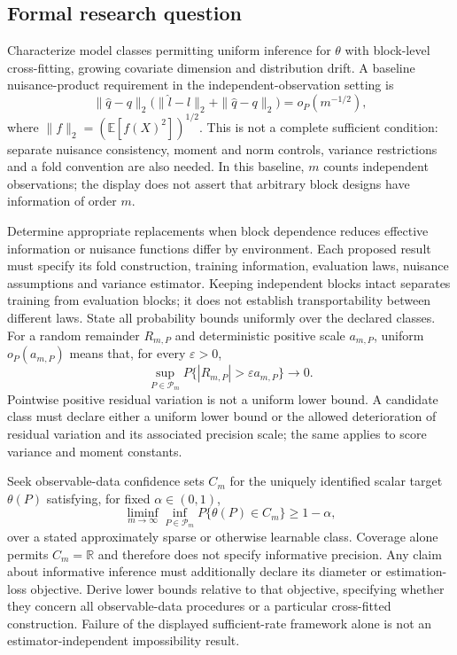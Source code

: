 \documentclass[11pt,a4paper]{article}
\begin{document}
\subsection*{Formal research question}

Characterize model classes permitting uniform inference for $\theta$ with block-level cross-fitting, growing covariate dimension and distribution drift. A baseline nuisance-product requirement in the independent-observation setting is
\[
\|\widehat q-q\|_2
\bigl(\|\widehat l-l\|_2+\|\widehat q-q\|_2\bigr)
=o_P(m^{-1/2}),
\]
where $\|f\|_2=(\mathbb E[f(X)^2])^{1/2}$. This is not a complete sufficient condition: separate nuisance consistency, moment and norm controls, variance restrictions and a fold convention are also needed. In this baseline, $m$ counts independent observations; the display does not assert that arbitrary block designs have information of order $m$.

Determine appropriate replacements when block dependence reduces effective information or nuisance functions differ by environment. Each proposed result must specify its fold construction, training information, evaluation laws, nuisance assumptions and variance estimator. Keeping independent blocks intact separates training from evaluation blocks; it does not establish transportability between different laws. State all probability bounds uniformly over the declared classes. For a random remainder $R_{m,P}$ and deterministic positive scale $a_{m,P}$, uniform $o_P(a_{m,P})$ means that, for every $\varepsilon>0$,
\[
\sup_{P\in\mathcal P_m}P\{|R_{m,P}|>\varepsilon a_{m,P}\}\longrightarrow0.
\]
Pointwise positive residual variation is not a uniform lower bound. A candidate class must declare either a uniform lower bound or the allowed deterioration of residual variation and its associated precision scale; the same applies to score variance and moment constants.

Seek observable-data confidence sets $C_m$ for the uniquely identified scalar target $\theta(P)$ satisfying, for fixed $\alpha\in(0,1)$,
\[
\liminf_{m\to\infty}\inf_{P\in\mathcal P_m}
P\{\theta(P)\in C_m\}\geq1-\alpha,
\]
over a stated approximately sparse or otherwise learnable class. Coverage alone permits $C_m=\mathbb R$ and therefore does not specify informative precision. Any claim about informative inference must additionally declare its diameter or estimation-loss objective. Derive lower bounds relative to that objective, specifying whether they concern all observable-data procedures or a particular cross-fitted construction. Failure of the displayed sufficient-rate framework alone is not an estimator-independent impossibility result.
\end{document}
